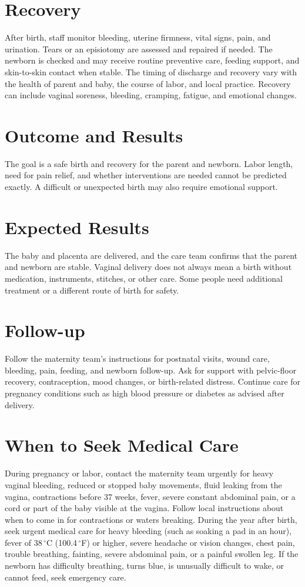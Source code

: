 \section*{Recovery}
After birth, staff monitor bleeding, uterine firmness, vital signs, pain, and urination. Tears or an episiotomy are assessed and repaired if needed. The newborn is checked and may receive routine preventive care, feeding support, and skin-to-skin contact when stable. The timing of discharge and recovery vary with the health of parent and baby, the course of labor, and local practice. Recovery can include vaginal soreness, bleeding, cramping, fatigue, and emotional changes.

\section*{Outcome and Results}
The goal is a safe birth and recovery for the parent and newborn. Labor length, need for pain relief, and whether interventions are needed cannot be predicted exactly. A difficult or unexpected birth may also require emotional support.

\section*{Expected Results}
The baby and placenta are delivered, and the care team confirms that the parent and newborn are stable. Vaginal delivery does not always mean a birth without medication, instruments, stitches, or other care. Some people need additional treatment or a different route of birth for safety.

\section*{Follow-up}
Follow the maternity team's instructions for postnatal visits, wound care, bleeding, pain, feeding, and newborn follow-up. Ask for support with pelvic-floor recovery, contraception, mood changes, or birth-related distress. Continue care for pregnancy conditions such as high blood pressure or diabetes as advised after delivery.

\section*{When to Seek Medical Care}
During pregnancy or labor, contact the maternity team urgently for heavy vaginal bleeding, reduced or stopped baby movements, fluid leaking from the vagina, contractions before 37 weeks, fever, severe constant abdominal pain, or a cord or part of the baby visible at the vagina. Follow local instructions about when to come in for contractions or waters breaking. During the year after birth, seek urgent medical care for heavy bleeding (such as soaking a pad in an hour), fever of 38\,$^\circ$C (100.4\,$^\circ$F) or higher, severe headache or vision changes, chest pain, trouble breathing, fainting, severe abdominal pain, or a painful swollen leg. If the newborn has difficulty breathing, turns blue, is unusually difficult to wake, or cannot feed, seek emergency care.

